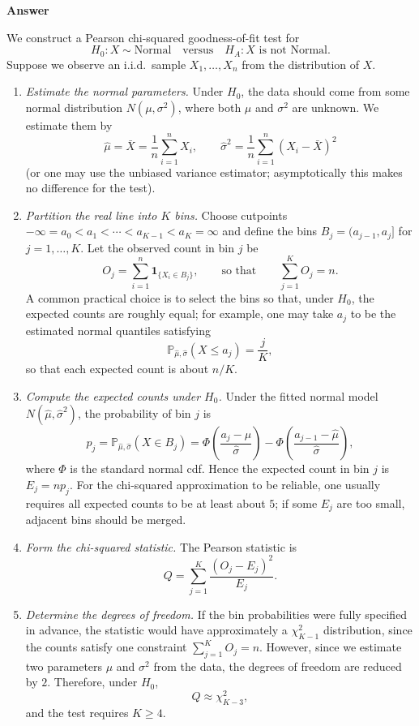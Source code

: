 \documentclass[letterpaper]{article}
\begin{document}
	\textbf{Answer}
	
	We construct a Pearson chi-squared goodness-of-fit test for
	$$H_0: X\sim \text{Normal} \quad \text{versus} \quad H_A: X \text{ is not Normal}.$$
	Suppose we observe an i.i.d.\ sample $X_1,\dots,X_n$ from the distribution of $X$.
	
	\begin{enumerate}
		\item \textit{Estimate the normal parameters.}
		Under $H_0$, the data should come from some normal distribution $N(\mu,\sigma^2)$, where both $\mu$ and $\sigma^2$ are unknown. We estimate them by
		$$\hat\mu=\bar X=\frac{1}{n}\sum_{i=1}^n X_i, \qquad \hat\sigma^2=\frac{1}{n}\sum_{i=1}^n (X_i-\bar X)^2$$
		(or one may use the unbiased variance estimator; asymptotically this makes no difference for the test).
		
		\item \textit{Partition the real line into $K$ bins.}
		Choose cutpoints $-\infty=a_0<a_1<\cdots<a_{K-1}<a_K=\infty$ and define the bins $B_j=(a_{j-1},a_j]$ for $j=1,\dots,K$. Let the observed count in bin $j$ be
		$$O_j=\sum_{i=1}^n \mathbf{1}_{\{X_i\in B_j\}}, \qquad \text{so that} \qquad \sum_{j=1}^K O_j=n.$$
		A common practical choice is to select the bins so that, under $H_0$, the expected counts are roughly equal; for example, one may take $a_j$ to be the estimated normal quantiles satisfying
		$$\mathbb{P}_{\hat\mu,\hat\sigma}(X\le a_j)=\frac{j}{K},$$
		so that each expected count is about $n/K$.
		
		\item \textit{Compute the expected counts under $H_0$.}
		Under the fitted normal model $N(\hat\mu,\hat\sigma^2)$, the probability of bin $j$ is
		$$p_j=\mathbb{P}_{\hat\mu,\hat\sigma}(X\in B_j)=\Phi\!\left(\frac{a_j-\hat\mu}{\hat\sigma}\right)-\Phi\!\left(\frac{a_{j-1}-\hat\mu}{\hat\sigma}\right),$$
		where $\Phi$ is the standard normal cdf. Hence the expected count in bin $j$ is $E_j=np_j$. For the chi-squared approximation to be reliable, one usually requires all expected counts to be at least about $5$; if some $E_j$ are too small, adjacent bins should be merged.
		
		\item \textit{Form the chi-squared statistic.}
		The Pearson statistic is
		$$Q=\sum_{j=1}^K \frac{(O_j-E_j)^2}{E_j}.$$
		
		\item \textit{Determine the degrees of freedom.}
		If the bin probabilities were fully specified in advance, the statistic would have approximately a $\chi^2_{K-1}$ distribution, since the counts satisfy one constraint $\sum_{j=1}^K O_j=n$. However, since we estimate two parameters $\mu$ and $\sigma^2$ from the data, the degrees of freedom are reduced by $2$. Therefore, under $H_0$,
		$$Q \approx \chi^2_{K-3},$$
		and the test requires $K\ge 4$.
		

\end{enumerate}
\end{document}
